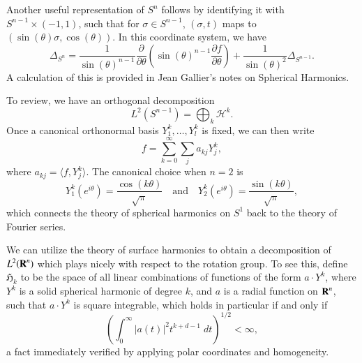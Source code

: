 Another useful representation of $S^n$ follows by identifying it with $S^{n-1} \times (-1,1)$, such that for $\sigma \in S^{n-1}$, $(\sigma,t)$ maps to $( \sin(\theta) \sigma, \cos(\theta)  )$. In this coordinate system, we have
%
\[ \Delta_{S^n} = \frac{1}{\sin(\theta)^{n-1}} \frac{\partial}{\partial \theta} \left( \sin(\theta)^{n-1} \frac{\partial f}{\partial \theta} \right) + \frac{1}{\sin(\theta)^2} \Delta_{S^{n-1}}. \]
%
A calculation of this is provided in Jean Gallier's notes on Spherical Harmonics.

To review, we have an orthogonal decomposition
%
\[ L^2(S^{n-1}) = \bigoplus_k \mathcal{H}^k. \]
%
Once a canonical orthonormal basis $Y^k_1, \dots, Y^k_l$ is fixed, we can then write
%
\[ f = \sum_{k = 0}^\infty \sum_j a_{kj} Y^k_j, \]
%
where $a_{kj} = \langle f, Y^k_j \rangle$. The canonical choice when $n = 2$ is
%
\[ Y^k_1(e^{i \theta}) = \frac{\cos(k \theta)}{\sqrt{\pi}} \quad\text{and}\quad Y^k_2(e^{i \theta}) = \frac{\sin(k \theta)}{\sqrt{\pi}}, \]
%
which connects the theory of spherical harmonics on $S^1$ back to the theory of Fourier series.

We can utilize the theory of surface harmonics to obtain a decomposition of $L^2(\operatorname{\mathbf{R}}^n)$ which plays nicely with respect to the rotation group. To see this, define $\mathfrak{H}_k$ to be the space of all linear combinations of functions of the form $a \cdot Y^k$, where $Y^k$ is a solid spherical harmonic of degree $k$, and $a$ is a radial function on $\operatorname{\mathbf{R}}^n$, such that $a \cdot Y^k$ is square integrable, which holds in particular if and only if
%
\[ \left( \int_0^\infty |a(t)|^2 t^{k+d-1}\; dt \right)^{1/2} < \infty, \]
%
a fact immediately verified by applying polar coordinates and homogeneity.

